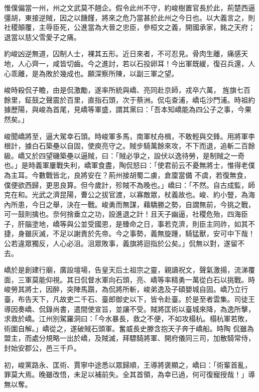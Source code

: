 \begin{pinyinscope}
 惟僕偏當一州，州之文武莫不翹企。假令此州不守，約峻樹置官長於此，荊楚西逼彊胡，東接逆賊，因之以饑饉，將來之危乃當甚於此州之今日也。以大義言之，則社稷顛覆，主辱臣死，公進當為大晉之忠臣，參桓文之義，開國承家，銘之天府；退當以慈父雪愛子之痛。



 約峻凶逆無道，囚制人士，裸其五形。近日來者，不可忍見。骨肉生離，痛感天地，人心齊一，咸皆切齒。今之進討，若以石投卵耳！今出軍既緩，復召兵還，人心乖離，是為敗於幾成也。願深察所陳，以副三軍之望。



 峻時殺侃子瞻，由是侃激勵，遂率所統與嶠、亮同赴京師，戎卒六萬，
 旌旗七百餘里，鉦鼓之聲震於百里，直指石頭，次于蔡洲。侃屯查浦，嶠屯沙門浦。時祖約據歷陽，與峻為首尾，見嶠等軍盛，謂其黨曰：「吾本知嶠能為四公子之事，今果然矣。」



 峻聞嶠將至，逼大駕幸石頭。時峻軍多馬，南軍杖舟楫，不敢輕與交鋒。用將軍李根計，據白石築壘以自固，使庾亮守之。賊步騎萬餘來攻，不下而退，追斬二百餘級。嶠又於四望磯築壘以逼賊，曰：「賊必爭之，設伏以逸待勞，是制賊之一奇也。」是時義軍屢戰失利，嶠軍食盡，陶侃怒曰：「使君前云不憂無將士，惟得老僕為主耳。今數戰皆北，良將安在？荊州接胡蜀二虜，倉廩當備
 不虞，若復無食，僕便欲西歸，更思良算。但今歲計，殄賊不為晚也。」嶠曰：「不然。自古成監，師克在和。光武之濟昆陽，曹公之拔官渡，以寡敵眾，杖義故也。峻、約小豎，為海內所患，今日之舉，決在一戰。峻勇而無謀，藉驕勝之勢，自謂無前，今挑之戰，可一鼓則擒也。奈何捨垂立之功，設進退之計！且天子幽逼，社稷危殆，四海臣子，肝腦塗地，嶠等與公並受國恩，是臻命之日，事若克濟，則臣主同祚，如其不捷，身雖灰滅，不足以謝責於先帝。今之事勢，義無旋踵，騎猛獸，安可中下哉！公若違眾獨反，人心必沮。沮眾敗事，義旗將迴指於公矣。」侃無以對，遂留不
 去。



 嶠於是創建行廟，廣設壇場，告皇天后土祖宗之靈，親讀祝文，聲氣激揚，流涕覆面，三軍莫能仰視。其日侃督水軍向石頭，亮、嶠等率精勇一萬從白石以挑戰。時峻勞其將士，因醉，突陣馬躓，為侃將所斬，峻弟逸及子碩嬰城自固。嶠乃立行臺，布告天下，凡故吏二千石、臺郎御史以下，皆令赴臺。於是至者雲集。司徒王導因奏嶠、侃錄尚書，遣間使宣旨，並讓不受。賊將匡術以臺城來降，為逸所擊，求救於嶠。江州別駕羅洞曰：「今水暴長，救之不便，不如攻榻杭。榻杭軍若敗，術圍自解。」嶠從之，遂破賊石頭軍。奮威長史滕含抱天子奔于嶠船。時陶
 侃雖為盟主，而處分規略一出於嶠，及賊滅，拜驃騎將軍、開府儀同三司，加散騎常侍，封始安郡公，邑三千戶。



 初，峻黨路永、匡術、賈寧中途悉以眾歸順，王導將褒顯之，嶠曰：「術輩首亂，罪莫大焉。晚雖改悟，未足以補前失。全其首領，為幸已過，何可復寵授哉！」導無以奪。




\end{pinyinscope}
